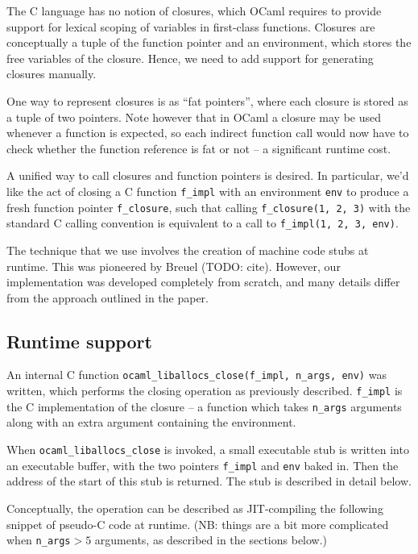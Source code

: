 \documentclass[12pt,a4paper,twoside,openright]{report}
\begin{document}
The C language has no notion of closures, which OCaml requires to provide
support for lexical scoping of variables in first-class functions. Closures are
conceptually a tuple of the function pointer and an environment, which stores
the free variables of the closure. Hence, we need to add support for generating
closures manually.

One way to represent closures is as ``fat pointers'', where each closure is
stored as a tuple of two pointers. Note however that in OCaml a closure may be
used whenever a function is expected, so each indirect function call would now
have to check whether the function reference is fat or not -- a significant
runtime cost.

A unified way to call closures and function pointers is desired. In
particular, we'd like the act of closing a C function \lstinline!f_impl! with
an environment \lstinline!env! to produce a fresh function pointer
\lstinline!f_closure!, such that calling
\lstinline!f_closure(1, 2, 3)!
with the standard C calling convention is equivalent to a call to
\lstinline!f_impl(1, 2, 3, env)!.

The technique that we use involves the creation of machine code stubs at
runtime. This was pioneered by Breuel (TODO: cite). However, our implementation
was developed completely from scratch, and many details differ from the
approach outlined in the paper.

\subsection{Runtime support}\label{closures-runtime-support}

An internal C function \lstinline{ocaml_liballocs_close(f_impl, n_args, env)}
was written, which performs the closing operation as previously described.
\lstinline!f_impl! is the C implementation of the closure -- a function which
takes \lstinline!n_args! arguments along with an extra argument containing the environment.

When \lstinline!ocaml_liballocs_close! is
invoked, a small executable stub is written into an executable
buffer, with the two pointers \lstinline!f_impl! and \lstinline!env! baked in.
Then the address of the start of this stub is returned. The stub is described
in detail below.

Conceptually, the operation can be described as JIT-compiling the following
snippet of pseudo-C code at runtime. (NB: things are a bit more complicated
when \lstinline!n_args!${} > 5$ arguments, as described in the sections below.)
\end{document}
